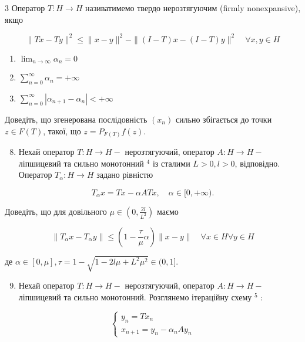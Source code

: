 \documentclass[10pt]{article}
\begin{document}
3 Оператор $T: H \rightarrow H$ називатимемо твердо нерозтягуючим (firmly nonexpansive), якщо

$$
\|T x-T y\|^{2} \leq\|x-y\|^{2}-\|(I-T) x-(I-T) y\|^{2} \quad \forall x, y \in H
$$

\begin{enumerate}
  \item $\lim _{n \rightarrow \infty} \alpha_{n}=0$

  \item $\sum_{n=0}^{\infty} \alpha_{n}=+\infty$

  \item $\sum_{n=0}^{\infty}\left|\alpha_{n+1}-\alpha_{n}\right|<+\infty$

\end{enumerate}

Доведіть, що згенерована послідовність $\left(x_{n}\right)$ сильно збігається до точки $z \in F(T)$, такої, що $z=P_{F(T)} f(z)$.

\begin{enumerate}
  \setcounter{enumi}{7}
  \item Нехай оператор $T: H \rightarrow H-$ нерозтягуючий, оператор $A: H \rightarrow H-$ ліпшицевий та сильно монотонний $^{4}$ із сталими $L>0, l>0$, відповідно. Оператор $T_{\alpha}: H \rightarrow H$ задано рівністю
\end{enumerate}

$$
T_{\alpha} x=T x-\alpha A T x, \quad \alpha \in[0,+\infty) .
$$

Доведіть, що для довільного $\mu \in\left(0, \frac{2 l}{L^{2}}\right)$ маємо

$$
\left\|T_{\alpha} x-T_{\alpha} y\right\| \leq\left(1-\frac{\tau}{\mu} \alpha\right)\|x-y\| \quad \forall x \in H \forall y \in H
$$

де $\alpha \in[0, \mu], \tau=1-\sqrt{1-2 l \mu+L^{2} \mu^{2}} \in(0,1]$.

\begin{enumerate}
  \setcounter{enumi}{8}
  \item Нехай оператор $T: H \rightarrow H-$ нерозтягуючий, оператор $A: H \rightarrow H-$ ліпшицевий та сильно монотонний. Розглянемо ітераційну схему ${ }^{5}$ :
\end{enumerate}

$$
\left\{\begin{array}{l}
y_{n}=T x_{n} \\
x_{n+1}=y_{n}-\alpha_{n} A y_{n}
\end{array}\right.
$$
\end{document}
